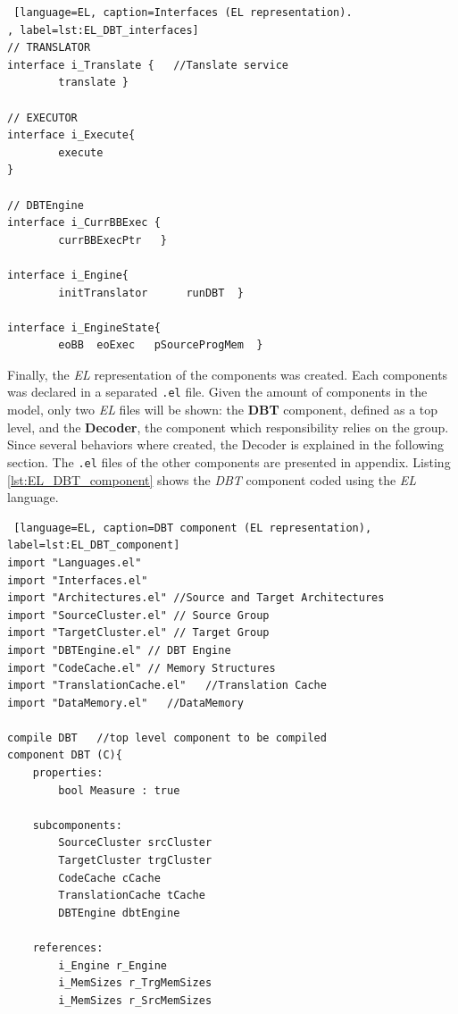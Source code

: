 \documentclass[12pt]{article}
\newcounter{subsubsubsection}[subsubsection]
\begin{document}
{\begin{lstlisting} [language=EL, caption=Interfaces (EL representation).
, label=lst:EL_DBT_interfaces]
// TRANSLATOR
interface i_Translate {   //Tanslate service
		translate }

// EXECUTOR 
interface i_Execute{
		execute
}

// DBTEngine 
interface i_CurrBBExec {   
		currBBExecPtr	}

interface i_Engine{
		initTranslator		runDBT  }

interface i_EngineState{
		eoBB  eoExec   pSourceProgMem  }
\end{lstlisting}



Finally, the \textit{EL} representation of the components was created.  Each components was declared in a separated \texttt{.el} file. Given the amount of components in the model, only two \textit{EL} files will be shown: the \textbf{DBT} component, defined as a top level, and the \textbf{Decoder}, the component which responsibility relies on the group. Since several behaviors where created, the Decoder is explained in the following section. The \texttt{.el} files of the other components are presented in appendix. Listing \ref{lst:EL_DBT_component} shows the \textit{DBT} component coded using the \textit{EL} language.


\begin{lstlisting} [language=EL, caption=DBT component (EL representation), label=lst:EL_DBT_component]
import "Languages.el"
import "Interfaces.el"
import "Architectures.el" //Source and Target Architectures 
import "SourceCluster.el" // Source Group
import "TargetCluster.el" // Target Group 
import "DBTEngine.el" // DBT Engine
import "CodeCache.el" // Memory Structures 
import "TranslationCache.el"   //Translation Cache
import "DataMemory.el"   //DataMemory 

compile DBT   //top level component to be compiled
component DBT (C){
	properties:
		bool Measure : true
		
	subcomponents:
		SourceCluster srcCluster
		TargetCluster trgCluster
		CodeCache cCache
		TranslationCache tCache	
		DBTEngine dbtEngine
		
	references:
		i_Engine r_Engine
		i_MemSizes r_TrgMemSizes
		i_MemSizes r_SrcMemSizes
		

\end{lstlisting}}
\end{document}
